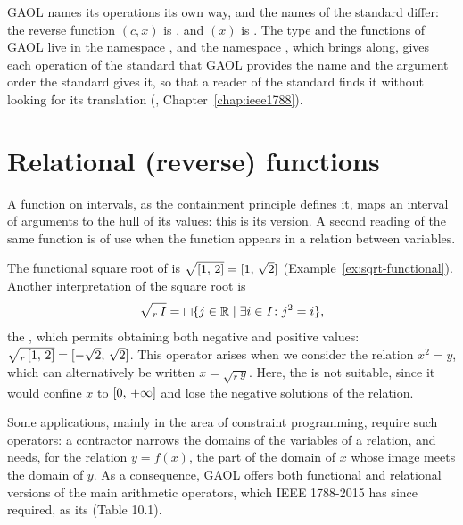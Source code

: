 \documentclass[12pt,a4paper,twoside,openright]{book}
\begin{document}
\medskip
\noindent GAOL names its operations its own way, and the names of the
standard differ: the reverse function $(c, x)$ is
, and $(x)$ is
. The type  and the functions
of GAOL live in the namespace , and the namespace
, which  brings along, gives each
operation of the standard that GAOL provides the name and the argument
order the standard gives it, so that a reader of the standard finds it
without looking for its translation (,
Chapter~\ref{chap:ieee1788}).\newinvfive
{}%

\section{Relational (reverse) functions}\label{sec:relational-idea}
%
%

A function on intervals, as the containment principle defines it, maps an
interval of arguments to the hull of its values: this is its
 version. A second reading of the same function is of use
when the function appears in a relation between variables.

\begin{Ex}\label{ex:sqrt-relational}
The functional square root of  is
$\sqrt{[1,\,2]}=[1,\,\sqrt{2}]$ (Example~\ref{ex:sqrt-functional}).
Another interpretation of the square root is
\begin{equation*}
  \sqrt{_r\,I}=\mathop{\Box} \{j\in\mathbb{R}\mid\exists i\in I\colon j^2=i\},
\end{equation*}
the , which permits obtaining both negative and
positive values: $\sqrt{_r\,[1,\,2]}=[-\sqrt{2},\,\sqrt{2}]$. This
operator arises when we consider the relation $x^2=y$, which can
alternatively be written $x=\sqrt{_r\,y}$. Here, the  is not suitable, since it would confine $x$ to $[0,\,+\infty]$ and
lose the negative solutions of the relation.
\end{Ex}

Some applications, mainly in the area of constraint programming, require
such operators: a contractor narrows the domains of the variables of a
relation, and needs, for the relation $y=f(x)$, the part of the domain of
$x$ whose image meets the domain of $y$. As a consequence, GAOL offers both
functional and relational versions of the main arithmetic operators, which
IEEE 1788-2015 has since required, as its 
(Table 10.1).
\end{document}
